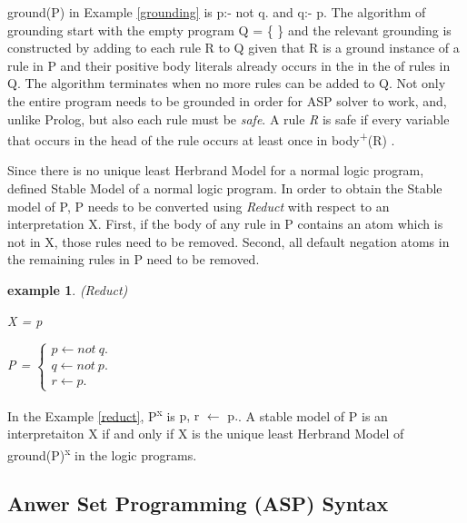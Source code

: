 \documentclass[12pt,twoside]{report}
\newtheorem{examp}{example}[section]
\begin{document}
ground(P) in Example \ref{grounding} is p:- not q. and q:- p. The algorithm of grounding start with the empty program Q = \{  \} and the relevant grounding is constructed by adding to each rule R to Q given that R is a ground instance of a rule in P and their positive body literals already occurs in the in the of rules in Q. The algorithm terminates when no more rules can be added to Q.
Not only the entire program needs to be grounded in order for ASP solver to work, and, unlike Prolog,  but also each rule must be \textit{safe}. A rule \textit{R} is safe if every variable that occurs in the head of the rule occurs at least once in body\textsuperscript{+}(R) .

Since there is no unique least Herbrand Model for a normal logic program, \cite{Gelfond1988} defined Stable Model of a normal logic program. In order to obtain the Stable model of P, P needs to be converted using \textit{Reduct} with respect to an interpretation X. First, if the body of any rule in P contains an atom which is not in X, those rules need to be removed. Second, all default negation atoms in the remaining rules in P need to be removed.

\begin{examp} \normalfont (Reduct)

X = {p}

P = $\begin{cases}
	p  \leftarrow not\ q. \\
  q  \leftarrow not\ p. \\
  r  \leftarrow p.
      \end{cases}$
\end{examp}
\label{reduct}

In the Example \ref{reduct}, P\textsuperscript{x} is {p, r $\leftarrow$ p.}.
A stable model of P is an interpretaiton X if and only if X is the unique least Herbrand Model of ground(P)\textsuperscript{x} in the logic programs.

\subsection{Anwer Set Programming (ASP) Syntax}
\end{document}
